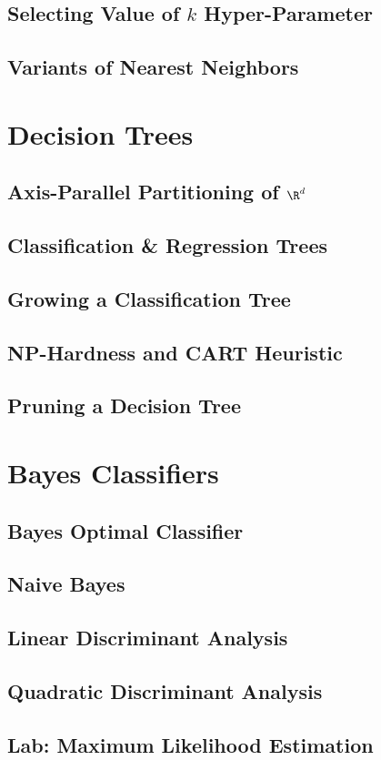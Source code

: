         \subsection{Selecting Value of $k$ Hyper-Parameter}
        \subsection{Variants of Nearest Neighbors}
        
    \section{Decision Trees}
        \subsection{Axis-Parallel Partitioning of $\R^d$}
        \subsection{Classification \& Regression Trees}
        \subsection{Growing a Classification Tree}
        \subsection{NP-Hardness and CART Heuristic}
        \subsection{Pruning a Decision Tree}
    
    \section{Bayes Classifiers}
        \subsection{Bayes Optimal Classifier}
        \subsection{Naive Bayes}
        \subsection{Linear Discriminant Analysis}
        \subsection{Quadratic Discriminant Analysis}
        \subsection{Lab: Maximum Likelihood Estimation}